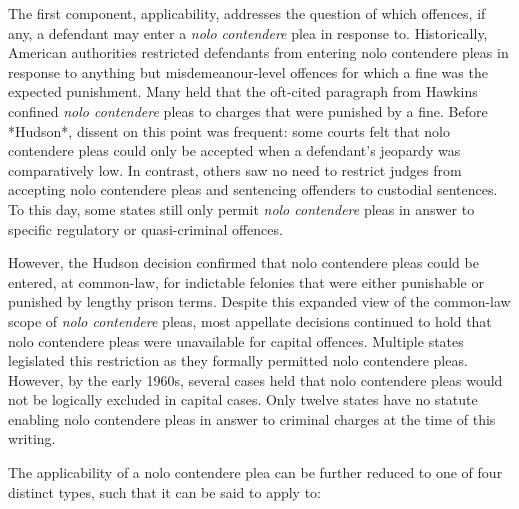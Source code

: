 The first component, applicability, addresses the question of which offences, if any, a defendant may enter a \textit{nolo contendere} plea in response to. Historically, American authorities restricted defendants from entering nolo contendere pleas in response to anything but misdemeanour-level offences for which a fine was the expected punishment. Many held that the oft-cited paragraph from Hawkins confined \textit{nolo contendere} pleas to charges that were punished by a fine. Before *Hudson*, dissent on this point was frequent: some courts felt that nolo contendere pleas could only be accepted when a defendant's jeopardy was comparatively low. In contrast, others saw no need to restrict judges from accepting nolo contendere pleas and sentencing offenders to custodial sentences. To this day, some states still only permit \textit{nolo contendere} pleas in answer to specific regulatory or quasi-criminal offences.

However, the Hudson decision confirmed that nolo contendere pleas could be entered, at common-law, for indictable felonies that were either punishable or punished by lengthy prison terms. Despite this expanded view of the common-law scope of \textit{nolo contendere} pleas, most appellate decisions continued to hold that nolo contendere pleas were unavailable for capital offences. Multiple states legislated this restriction as they formally permitted nolo contendere pleas. However, by the early 1960s, several cases held that nolo contendere pleas would not be logically excluded in capital cases. Only twelve states have no statute enabling nolo contendere pleas in answer to criminal charges at the time of this writing.

The applicability of a nolo contendere plea can be further reduced to one of four distinct types, such that it can be said to apply to:

